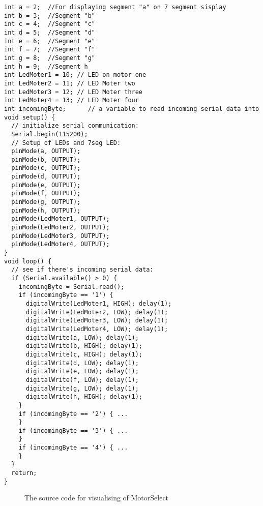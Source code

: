 \begin{lstlisting}[frame=single,language=Arduino]
int a = 2;  //For displaying segment "a" on 7 segment sisplay
int b = 3;  //Segment "b"
int c = 4;  //Segment "c"
int d = 5;  //Segment "d"
int e = 6;  //Segment "e"
int f = 7;  //Segment "f"
int g = 8;  //Segment "g"
int h = 9;  //Segment h
int LedMoter1 = 10; // LED on motor one
int LedMoter2 = 11; // LED Moter two
int LedMoter3 = 12; // LED Moter three
int LedMoter4 = 13; // LED Moter four
int incomingByte;      // a variable to read incoming serial data into
void setup() {
  // initialize serial communication:
  Serial.begin(115200);
  // Setup of LEDs and 7seg LED:
  pinMode(a, OUTPUT);
  pinMode(b, OUTPUT);
  pinMode(c, OUTPUT);
  pinMode(d, OUTPUT);
  pinMode(e, OUTPUT);
  pinMode(f, OUTPUT);
  pinMode(g, OUTPUT);
  pinMode(h, OUTPUT);
  pinMode(LedMoter1, OUTPUT);
  pinMode(LedMoter2, OUTPUT);
  pinMode(LedMoter3, OUTPUT);
  pinMode(LedMoter4, OUTPUT);
}
void loop() {
  // see if there's incoming serial data:
  if (Serial.available() > 0) {
    incomingByte = Serial.read();
    if (incomingByte == '1') {
      digitalWrite(LedMoter1, HIGH); delay(1);
      digitalWrite(LedMoter2, LOW); delay(1);
      digitalWrite(LedMoter3, LOW); delay(1);
      digitalWrite(LedMoter4, LOW); delay(1);
      digitalWrite(a, LOW); delay(1);
      digitalWrite(b, HIGH); delay(1);
      digitalWrite(c, HIGH); delay(1);
      digitalWrite(d, LOW); delay(1);
      digitalWrite(e, LOW); delay(1);
      digitalWrite(f, LOW); delay(1);
      digitalWrite(g, LOW); delay(1);
      digitalWrite(h, HIGH); delay(1);
    }
    if (incomingByte == '2') { ...
    }
    if (incomingByte == '3') { ...
    }
    if (incomingByte == '4') { ...
    }
  }
  return;
}
\end{lstlisting} \label{fig:AS}
\begin{figure}[H]
    \centering
    \caption{The source code for visualising of MotorSelect}
\end{figure}



